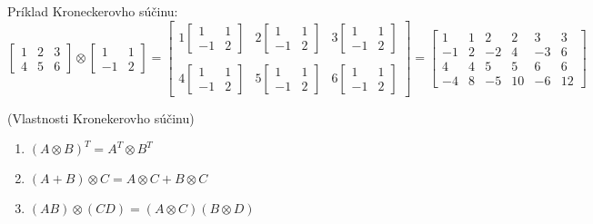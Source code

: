 \begin{remark}
Príklad Kroneckerovho súčinu:
$$
\begin{bmatrix}
1 & 2 & 3 \\ 4 & 5 & 6
\end{bmatrix}
\otimes
\begin{bmatrix} 1 & 1 \\ -1 & 2 \end{bmatrix}
= 
\begin{bmatrix}
1 \begin{bmatrix} 1 & 1 \\ -1 & 2 \end{bmatrix}  &  2 \begin{bmatrix} 1 & 1 \\ -1 & 2 \end{bmatrix} & 3 \begin{bmatrix} 1 & 1 \\ -1 & 2 \end{bmatrix} \\ \\
4 \begin{bmatrix} 1 & 1 \\ -1 & 2 \end{bmatrix} & 5 \begin{bmatrix} 1 & 1 \\ -1 & 2 \end{bmatrix} & 6\begin{bmatrix} 1 & 1 \\ -1 & 2 \end{bmatrix}
\end{bmatrix}
=
\begin{bmatrix}
1 & 1 & 2 & 2 & 3 & 3\\
-1 & 2 & -2 & 4 & -3 & 6\\
4 & 4 & 5 & 5 & 6 & 6\\
-4 & 8 & -5 & 10 & -6 & 12
\end{bmatrix}
$$
\end{remark}

\begin{theorem_hard}{(Vlastnosti Kronekerovho súčinu)}
\label{th:kr_formulas}
\begin{enumerate}
    \item $(A \otimes B)^T = A^T \otimes B^T$
    \item $(A + B) \otimes C = A \otimes C + B \otimes C$
    \item $(A B) \otimes (C D) = (A \otimes C)(B \otimes D)$
\end{enumerate}
\end{theorem_hard}

